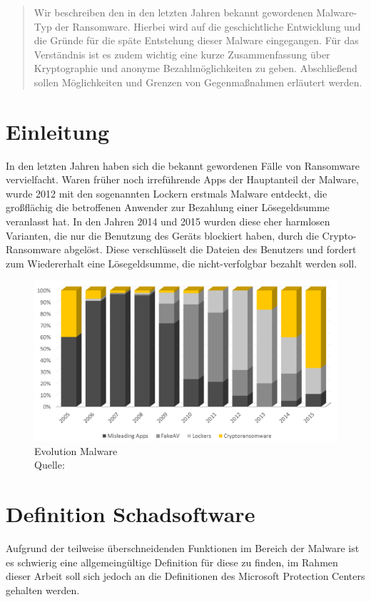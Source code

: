 \begin{abstract}
Wir beschreiben den in den letzten Jahren bekannt gewordenen Malware-Typ der Ransomware. Hierbei wird auf die geschichtliche Entwicklung und die Gründe für die späte Entstehung dieser Malware eingegangen. Für das Verständnis ist es zudem wichtig eine kurze Zusammenfassung über Kryptographie und anonyme Bezahlmöglichkeiten zu geben. Abschließend sollen Möglichkeiten und Grenzen von Gegenmaßnahmen erläutert werden.
\end{abstract}

\section{Einleitung}
\label{sec:einleitung}
	In den letzten Jahren haben sich die bekannt gewordenen Fälle von Ransomware vervielfacht. Waren früher noch irreführende Apps der Hauptanteil der Malware, wurde 2012 mit den sogenannten Lockern erstmals Malware entdeckt, die großflächig die betroffenen Anwender zur Bezahlung einer Lösegeldsumme veranlasst hat. In den Jahren 2014 und 2015 wurden diese eher harmlosen Varianten, die nur die Benutzung des Geräts blockiert haben, durch die Crypto-Ransomware abgelöst. Diese verschlüsselt die Dateien des Benutzers und fordert zum Wiedererhalt eine Lösegeldsumme, die nicht-verfolgbar bezahlt werden soll.

	\begin{figure}[h!]
		\centering
		\includegraphics[width=\linewidth]{img/ransom-evolution.png}
		\caption{Evolution Malware \\ Quelle: \cite{aids:sdf}}
		\label{fig:ransom-evo}
	\end{figure}

\section{Definition Schadsoftware}
\label{sec:definition}
		Aufgrund der teilweise überschneidenden Funktionen im Bereich der Malware ist es schwierig eine allgemeingültige Definition für diese zu finden, im Rahmen dieser Arbeit soll sich jedoch an die Definitionen des Microsoft Protection Centers \cite{malware_pc} gehalten werden.

